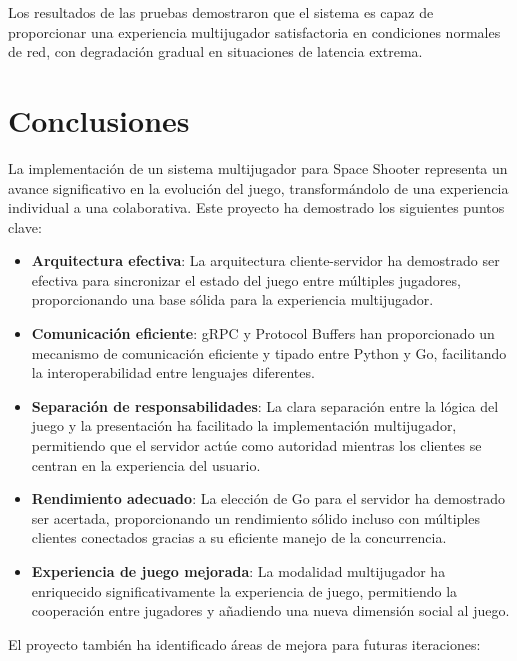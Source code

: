\documentclass[12pt,letterpaper]{article}
\begin{document}
Los resultados de las pruebas demostraron que el sistema es capaz de proporcionar una experiencia multijugador satisfactoria en condiciones normales de red, con degradación gradual en situaciones de latencia extrema.

\section{Conclusiones}

La implementación de un sistema multijugador para Space Shooter representa un avance significativo en la evolución del juego, transformándolo de una experiencia individual a una colaborativa. Este proyecto ha demostrado los siguientes puntos clave:

\begin{itemize}
    \item \textbf{Arquitectura efectiva}: La arquitectura cliente-servidor ha demostrado ser efectiva para sincronizar el estado del juego entre múltiples jugadores, proporcionando una base sólida para la experiencia multijugador.
    
    \item \textbf{Comunicación eficiente}: gRPC y Protocol Buffers han proporcionado un mecanismo de comunicación eficiente y tipado entre Python y Go, facilitando la interoperabilidad entre lenguajes diferentes.
    
    \item \textbf{Separación de responsabilidades}: La clara separación entre la lógica del juego y la presentación ha facilitado la implementación multijugador, permitiendo que el servidor actúe como autoridad mientras los clientes se centran en la experiencia del usuario.
    
    \item \textbf{Rendimiento adecuado}: La elección de Go para el servidor ha demostrado ser acertada, proporcionando un rendimiento sólido incluso con múltiples clientes conectados gracias a su eficiente manejo de la concurrencia.
    
    \item \textbf{Experiencia de juego mejorada}: La modalidad multijugador ha enriquecido significativamente la experiencia de juego, permitiendo la cooperación entre jugadores y añadiendo una nueva dimensión social al juego.
\end{itemize}

El proyecto también ha identificado áreas de mejora para futuras iteraciones:
\end{document}
